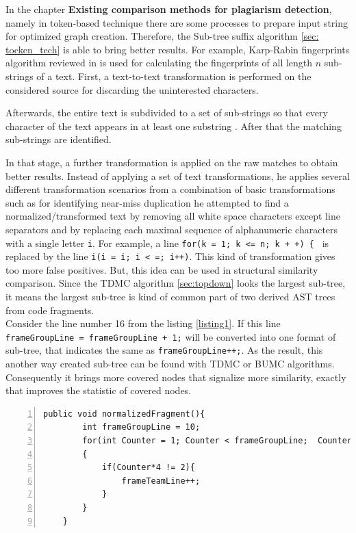 \documentclass{report}
\begin{document}
In the chapter \textbf{Existing comparison methods for plagiarism detection}, namely in token-based technique there are some processes to prepare input string for optimized graph creation. Therefore, the Sub-tree suffix algorithm \ref{sec: tocken_tech} is able to bring better results.
For example, Karp-Rabin fingerprints algorithm reviewed in \cite{software_clone_detection} is used for calculating the fingerprints of all
length $n$ sub-strings of a text. First, a text-to-text transformation is performed on the considered source for discarding the uninterested characters.

Afterwards, the entire text
is subdivided to a set of sub-strings so that every character of the text appears in at least
one substring \cite{software_clone_detection}. After that the matching sub-strings are identified. 

In that stage, a further transformation is applied on the raw matches to obtain better results. Instead of applying
a set of text transformations, he applies several different transformation scenarios
from a combination of basic transformations such as for identifying near-miss duplication he
attempted to find a normalized/transformed text by removing all white space characters
except line separators and by replacing each maximal sequence of alphanumeric characters
with a single letter \texttt{i}. For example, a line \texttt{for(k = 1; k <= n; k + +) \{ } is replaced by
the line \texttt{i(i = i; i < =; i++)}. This kind of transformation gives too more false positives. But, this idea can be used in structural similarity comparison. Since the TDMC algorithm \ref{sec:topdown} looks the largest sub-tree, it means the largest sub-tree is kind of common part of two derived AST trees from code fragments. \\
Consider the line number 16 from the listing \ref{listing1}. If this line \texttt{frameGroupLine = frameGroupLine + 1;} will be converted into one format of sub-tree, that indicates the same as \texttt{frameGroupLine++;}. As the result, this another way created sub-tree can be found with TDMC or BUMC algorithms. Consequently it brings more covered nodes that signalize more similarity, exactly that improves the statistic of covered nodes.

\begin{lstlisting}[caption= {Normalized function \texttt{test3()} concerning variable \texttt {frameGroupLine}}, label = listing2, numbers=left, numbersep=-5pt]
	public void normalizedFragment(){
		int frameGroupLine = 10;
		for(int Counter = 1; Counter < frameGroupLine;  Counter =+ 2)
		{
			if(Counter*4 != 2){ 
				frameTeamLine++;
			}
		}
	}
\end{lstlisting}
\end{document}
